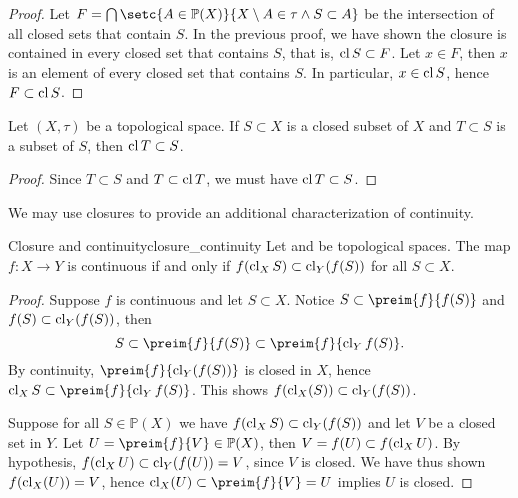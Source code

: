\begin{proof}
    Let \(F = \bigcap \setc{A \in \mathbb{P}(X)}{X \setminus A \in \tau \land S \subset A}\) be the intersection of all closed sets that contain \(S\). In the previous proof, we have shown the closure is contained in every closed set that contains \(S\), that is, \(\operatorname{cl}{S} \subset F\). Let \(x \in F\), then \(x\) is an element of every closed set that contains \(S\). In particular, \(x \in \operatorname{cl}{S}\), hence \(F \subset \operatorname{cl}{S}\).
\end{proof}
\begin{corollary}
    Let \((X, \tau)\) be a topological space. If \(S \subset X\) is a closed subset of \(X\) and \(T \subset S\) is a subset of \(S\), then \(\operatorname{cl}{T} \subset S\).
\end{corollary}
\begin{proof}
    Since \(T \subset S\) and \(T \subset \operatorname{cl}{T}\), we must have \(\operatorname{cl}{T} \subset S\).
\end{proof}

We may use closures to provide an additional characterization of continuity.
\begin{theorem}{Closure and continuity}{closure_continuity}
    Let  and  be topological spaces. The map \(f : X \to Y\) is continuous if and only if \(f(\operatorname{cl}_XS) \subset \operatorname{cl}_Y(f(S))\) for all \(S \subset X\).
\end{theorem}
\begin{proof}
    Suppose \(f\) is continuous and let \(S \subset X\). Notice \(S \subset \preim{f}{f(S)}\) and \(f(S) \subset \operatorname{cl}_Y(f(S))\), then
    \begin{equation*}
        S \subset \preim{f}{f(S)} \subset \preim{f}{\cl_Y{f(S)}}.
    \end{equation*}
    By continuity, \(\preim{f}{\cl_Y(f(S))}\) is closed in \(X\), hence \(\cl_XS \subset \preim{f}{\cl_Y{f(S)}}\). This shows \(f(\operatorname{cl}_X(S)) \subset \operatorname{cl}_Y(f(S))\).

    Suppose for all \(S \in \mathbb{P}(X)\) we have \(f(\operatorname{cl}_XS) \subset \operatorname{cl}_Y(f(S))\) and let \(V\) be a closed set in \(Y\). Let \(U = \preim{f}{V} \in \mathbb{P}(X)\), then \(V = f(U) \subset f(\operatorname{cl}_X U)\). By hypothesis, \(f(\operatorname{cl}_XU) \subset \operatorname{cl}_Y(f(U)) = V\), since \(V\) is closed. We have thus shown \(f(\operatorname{cl}_X(U)) = V\), hence \(\cl_X(U) \subset \preim{f}{V} = U\) implies \(U\) is closed.
\end{proof}

